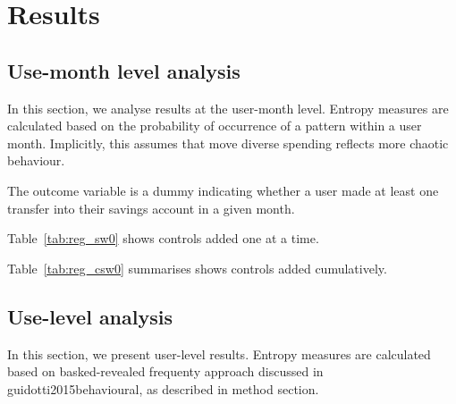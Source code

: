 
\section{Results}%
\label{sec:results}

\subsection{Use-month level analysis}%
\label{sub:use_month_level_analysis}

In this section, we analyse results at the user-month level. Entropy measures
are calculated based on the probability of occurrence of a pattern within a
user month. Implicitly, this assumes that move diverse spending reflects more
chaotic behaviour.

The outcome variable is a dummy indicating whether a user made at least one
transfer into their savings account in a given month.

Table~\ref{tab:reg_sw0} shows controls added one at a time.

\begin{landscape}
    
\end{landscape}

Table~\ref{tab:reg_csw0} summarises shows controls added cumulatively.

\begin{landscape}
    
\end{landscape}


\subsection{Use-level analysis}%
\label{sub:use_level_analysis}

In this section, we present user-level results. Entropy measures are calculated
based on basked-revealed frequenty approach discussed in
guidotti2015behavioural, as described in method section.

